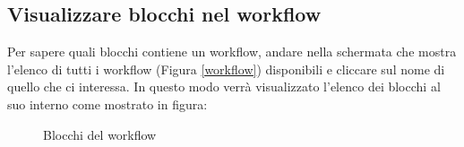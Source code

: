 \subsection{Visualizzare blocchi nel workflow}\label{visualizzazione}
Per sapere quali blocchi contiene un workflow, andare nella schermata che mostra l'elenco di tutti i workflow (Figura \ref{workflow}) disponibili e cliccare sul nome di quello che ci interessa.
In questo modo verrà visualizzato l'elenco dei blocchi al suo interno come mostrato in figura:
\begin{figure}[!ht]
	\centering
	\caption{Blocchi del workflow}
\end{figure}
\newpage
